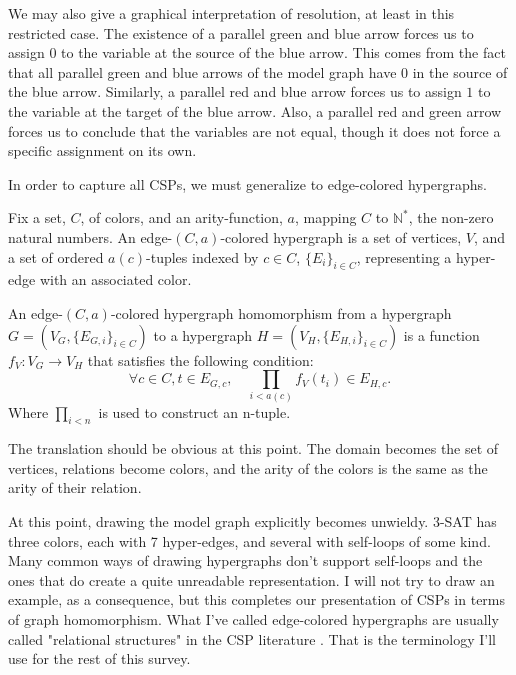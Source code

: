 We may also give a graphical interpretation of resolution, at least in this restricted case. The existence of a parallel green and blue arrow forces us to assign $0$ to the variable at the source of the blue arrow. This comes from the fact that all parallel green and blue arrows of the model graph have $0$ in the source of the blue arrow. Similarly, a parallel red and blue arrow forces us to assign $1$ to the variable at the target of the blue arrow. Also, a parallel red and green arrow forces us to conclude that the variables are not equal, though it does not force a specific assignment on its own.

In order to capture all CSPs, we must generalize to edge-colored hypergraphs. 

\begin{definition}
Fix a set, $C$, of colors, and an arity-function, $a$, mapping $C$ to $\mathbb{N}^*$, the non-zero natural numbers. An edge-$(C, a)$-colored hypergraph is a set of vertices, $V$, and a set of ordered $a(c)$-tuples indexed by $c \in C$, $\{E_i\}_{i\in C}$, representing a hyper-edge with an associated color. 
\end{definition}

\begin{definition}
An edge-$(C, a)$-colored hypergraph homomorphism from a hypergraph $G = (V_G, \{E_{G,i}\}_{i\in C})$ to a hypergraph $H = (V_H, \{E_{H, i}\}_{i\in C})$ is a function $f_V: V_G \rightarrow V_H$ that satisfies the following condition:
\begin{equation}
    \forall c \in C, t \in E_{G, c}, \quad \prod_{i<a(c)} f_V(t_i) \in E_{H, c}.    
\end{equation}
Where $\prod_{i<n}$ is used to construct an n-tuple.
\end{definition}

The translation should be obvious at this point. The domain becomes the set of vertices, relations become colors, and the arity of the colors is the same as the arity of their relation.

At this point, drawing the model graph explicitly becomes unwieldy. 3-SAT has three colors, each with 7 hyper-edges, and several with self-loops of some kind. Many common ways of drawing hypergraphs don't support self-loops and the ones that do create a quite unreadable representation. I will not try to draw an example, as a consequence, but this completes our presentation of CSPs in terms of graph homomorphism. What I've called edge-colored hypergraphs are usually called "relational structures" in the CSP literature \citep{feder1998computational}. That is the terminology I'll use for the rest of this survey.

